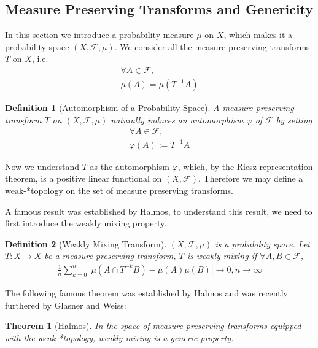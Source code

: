\documentclass{article}
\newtheorem{definition}{Definition}
\newtheorem{theorem}{Theorem}
\begin{document}
\begin{CJK}{UTF8}{gbsn}
\subsection{Measure Preserving Transforms and Genericity}

In this section we introduce a probability measure $\mu$ on $X$, which makes it a probability space $(X,\mathscr{F},\mu)$. We consider all the measure preserving transforms $T$ on $X$, i.e.
\begin{align*}
	\forall A\in\mathscr{F},\\
	\mu(A)=\mu(T^{-1}A)
\end{align*}


\begin{definition}[Automorphism of a Probability Space]
	A measure preserving transform $T$ on $(X,\mathscr{F},\mu)$ naturally induces an automorphism $\varphi$ of $\mathscr{F}$ by setting
	\begin{align*}
	\forall A\in\mathscr{F},\\
		\varphi(A):=T^{-1}A
	\end{align*}
\end{definition}

Now we understand $T$ as the automorphism $\varphi$, which, by the Riesz representation theorem, is a positive linear functional on $(X,\mathscr{F})$. Therefore we may define a weak-*topology on the set of measure preserving transforms.

A famous result was established by Halmos, to understand this result, we need to first introduce the weakly mixing property.

\begin{definition}[Weakly Mixing Transform]
	$(X,\mathscr{F},\mu)$ is a probability space. Let $T:X\rightarrow X$ be a measure preserving transform, $T$ is weakly mixing if $\forall A,B\in\mathscr{F}$,
	\begin{align*}
		\frac{1}{n}\sum_{k=0}^n|\mu(A\cap T^{-k}B)-\mu(A)\mu(B)|\rightarrow 0,n\rightarrow \infty
	\end{align*}
\end{definition}

The following famous theorem was established by Halmos\cite{Halmos} and was recently furthered by Glasner and Weiss\cite{Glasner}:

\begin{theorem}[Halmos]
	In the space of measure preserving transforms equipped with the weak-*topology, weakly mixing is a generic property.
\end{theorem}




\end{CJK}
\end{document}
